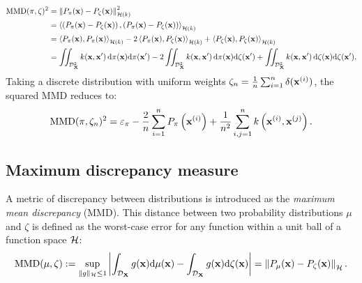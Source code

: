 \begin{subequations}
\begin{align}
    \mathrm{MMD}(\pi, \zeta)^2 &= \left\lVert P_{\pi}({\bf x}) - P_{\zeta}({\bf x}) \right\lVert^2_{\mathcal{H}(k)}\\
        &= \left\langle \left(P_{\pi}({\bf x}) - P_{\zeta}({\bf x}) \right), \left(P_{\pi}({\bf x}) - P_{\zeta}({\bf x}) \right) \right\rangle_{\mathcal{H}(k)}\\
        &= \left\langle P_{\pi}({\bf x}), P_{\pi}({\bf x}) \right\rangle_{\mathcal{H}(k)} - 2 \left\langle P_{\pi}({\bf x}), P_{\zeta}({\bf x}) \right\rangle_{\mathcal{H}(k)} + \left\langle P_{\zeta}({\bf x}), P_{\zeta}({\bf x}) \right\rangle_{\mathcal{H}(k)}\\
        &= \iint_{\mathcal{D}_{{\bf X}}^2} k({\bf x}, {\bf x}')\, \mathrm{d}\pi({\bf x}) \mathrm{d}\pi({\bf x}') - 2 \iint_{\mathcal{D}_{{\bf X}}^2} k({\bf x}, {\bf x}')\, \mathrm{d}\pi({\bf x}) \mathrm{d}\zeta({\bf x}') + \iint_{\mathcal{D}_{{\bf X}}^2} k({\bf x}, {\bf x}')\, \mathrm{d}\zeta({\bf x}) \mathrm{d}\zeta({\bf x}').
\end{align}
\end{subequations}
Taking a discrete distribution with uniform weights $\zeta_n= \frac{1}{n} \sum_{i=1}^{n} \delta({\bf x}^{(i)})$, the squared MMD reduces to: 
\begin{equation}\label{eq:mmd_design}
    \mathrm{MMD}(\pi, \zeta_n)^2 = \varepsilon_\pi - \frac{2}{n} \sum_{i=1}^n P_{\pi}\left({\bf x}^{(i)}\right) + \frac{1}{n^2} \sum_{i, j=1}^n k\left({\bf x}^{(i)}, {\bf x}^{(j)}\right).
\end{equation}





\subsection*{Maximum discrepancy measure}

A metric of discrepancy between distributions is introduced as the \emph{maximum mean discrepancy} (MMD). 
This distance between two probability distributions $\mu$ and $\zeta$ is defined as the worst-case error for any function within a unit ball of a function space $\mathcal{H}$:
\begin{equation}
    \MMD(\mu, \zeta) := %
    \sup_{\lVert g \lVert_{\iH} \leq 1}
            \left | \int_{\iD_{\bX}} g(\bx) \dd \mu(\bx) - \int_{\iD_{\bX}} g(\bx) \dd \zeta(\bx) \right| = \left\lVert P_{\mu}(\bx) - P_{\zeta}(\bx) \right\lVert_{\iH}.
    \label{eq:mmd}  
\end{equation}

